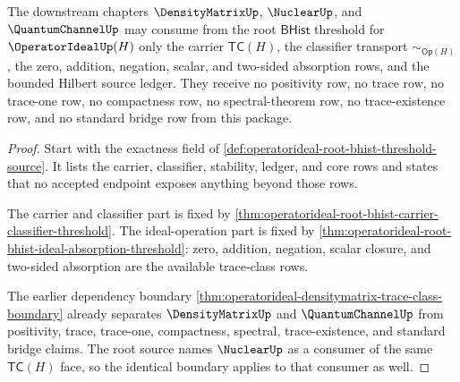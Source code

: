 \begin{theorem}
\label{thm:operatorideal-root-bhist-downstream-face-boundary}
The downstream chapters $\DensityMatrixUp$, $\NuclearUp$, and $\QuantumChannelUp$ may consume from the root $\mathsf{BHist}$ threshold for $\OperatorIdealUp(H)$ only the carrier $\mathsf{TC}(H)$, the classifier transport $\sim_{\mathsf{Op}(H)}$, the zero, addition, negation, scalar, and two-sided absorption rows, and the bounded Hilbert source ledger. They receive no positivity row, no trace row, no trace-one row, no compactness row, no spectral-theorem row, no trace-existence row, and no standard bridge row from this package.
\end{theorem}
\begin{proof}
Start with the exactness field of \autoref{def:operatorideal-root-bhist-threshold-source}. It lists the carrier, classifier, stability, ledger, and core rows and states that no accepted endpoint exposes anything beyond those rows.

The carrier and classifier part is fixed by \autoref{thm:operatorideal-root-bhist-carrier-classifier-threshold}. The ideal-operation part is fixed by \autoref{thm:operatorideal-root-bhist-ideal-absorption-threshold}: zero, addition, negation, scalar closure, and two-sided absorption are the available trace-class rows.

The earlier dependency boundary \autoref{thm:operatorideal-densitymatrix-trace-class-boundary} already separates $\DensityMatrixUp$ and $\QuantumChannelUp$ from positivity, trace, trace-one, compactness, spectral, trace-existence, and standard bridge claims. The root source names $\NuclearUp$ as a consumer of the same $\mathsf{TC}(H)$ face, so the identical boundary applies to that consumer as well.
\end{proof}

